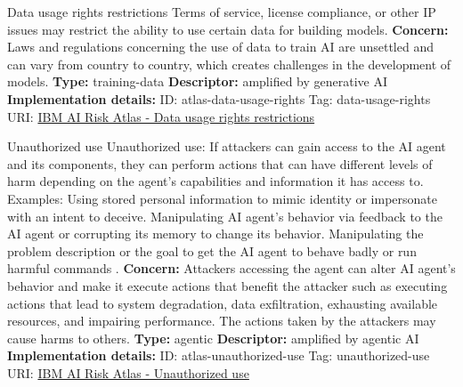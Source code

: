 \begin{definitionbox}{Data usage rights restrictions}
Terms of service, license compliance, or other IP issues may restrict the ability to use certain data for building models.\newline\newline
\textbf{Concern: }Laws and regulations concerning the use of data to train AI are unsettled and can vary from country to country, which creates challenges in the development of models.\newline\newline
\textbf{Type: }training-data\newline
\textbf{Descriptor: }amplified by generative AI \newline\newline
\textbf{Implementation details: } \newline
ID: atlas-data-usage-rights \newline
Tag: data-usage-rights \newline
URI:  \href{https://www.ibm.com/docs/en/watsonx/saas?topic=SSYOK8/wsj/ai-risk-atlas/data-usage-rights.html}{IBM AI Risk Atlas - Data usage rights restrictions}\newline
\end{definitionbox}
\begin{definitionbox}{Unauthorized use}
Unauthorized use: If attackers can gain access to the AI agent and its components, they can perform actions that can have different levels of harm depending on the agent's capabilities and information it has access to. Examples: Using stored personal information to mimic identity or impersonate with an intent to deceive. Manipulating AI agent's behavior via feedback to the AI agent or corrupting its memory to change its behavior. Manipulating the problem description or the goal to get the AI agent to behave badly or run harmful commands .\newline\newline
\textbf{Concern: }Attackers accessing the agent can alter AI agent's behavior and make it execute actions that benefit the attacker such as executing actions that lead to system degradation, data exfiltration, exhausting available resources, and impairing performance. The actions taken by the attackers may cause harms to others.\newline\newline
\textbf{Type: }agentic\newline
\textbf{Descriptor: }amplified by agentic AI \newline\newline
\textbf{Implementation details: } \newline
ID: atlas-unauthorized-use \newline
Tag: unauthorized-use \newline
URI:  \href{https://www.ibm.com/docs/en/watsonx/saas?topic=SSYOK8/wsj/ai-risk-atlas/unauthorized-use.html}{IBM AI Risk Atlas - Unauthorized use}\newline
\end{definitionbox}

